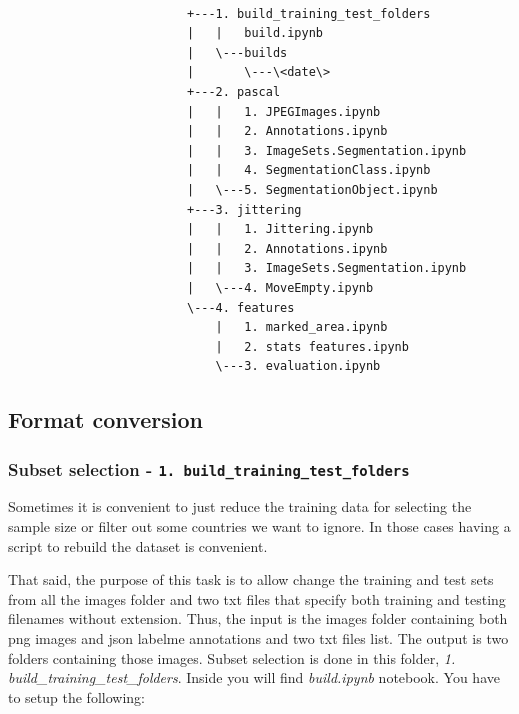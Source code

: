 \documentclass[]{article}
\theoremstyle{definition}
\theoremstyle{definition}
\theoremstyle{definition}
\theoremstyle{remark}
\begin{document}
\begin{verbatim}

                         +---1. build_training_test_folders
                         |   |   build.ipynb
                         |   \---builds
                         |       \---\<date\>
                         +---2. pascal
                         |   |   1. JPEGImages.ipynb
                         |   |   2. Annotations.ipynb
                         |   |   3. ImageSets.Segmentation.ipynb
                         |   |   4. SegmentationClass.ipynb
                         |   \---5. SegmentationObject.ipynb
                         +---3. jittering
                         |   |   1. Jittering.ipynb
                         |   |   2. Annotations.ipynb
                         |   |   3. ImageSets.Segmentation.ipynb
                         |   \---4. MoveEmpty.ipynb
                         \---4. features
                             |   1. marked_area.ipynb
                             |   2. stats features.ipynb
                             \---3. evaluation.ipynb
\end{verbatim}

\normalsize
\begin{figure}
\end{figure}

\hypertarget{format-conversion}{%
\subsection{Format conversion}\label{format-conversion}}

\hypertarget{subset-selection---1.-build_training_test_folders}{%
\subsubsection{\texorpdfstring{Subset selection -
\texttt{1.\ build\_training\_test\_folders}}{Subset selection - 1. build\_training\_test\_folders}}\label{subset-selection---1.-build_training_test_folders}}

Sometimes it is convenient to just reduce the training data for
selecting the sample size or filter out some countries we want to
ignore. In those cases having a script to rebuild the dataset is
convenient.

That said, the purpose of this task is to allow change the training and
test sets from all the images folder and two txt files that specify both
training and testing filenames without extension. Thus, the input is the
images folder containing both png images and json labelme annotations
and two txt files list. The output is two folders containing those
images. Subset selection is done in this folder, \emph{1.
build\_training\_test\_folders}. Inside you will find \emph{build.ipynb}
notebook. You have to setup the following:
\end{document}
